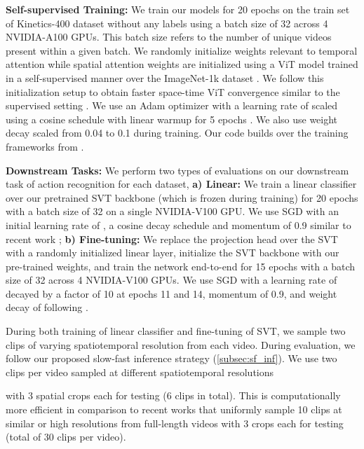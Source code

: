 \documentclass[10pt,twocolumn,letterpaper]{article}
\begin{document}
\vspace{0.1em}
\noindent\textbf{Self-supervised Training:} We train our models for 20 epochs on the train set of Kinetics-400 dataset \cite{kinetics400} without any labels using a batch size of 32 across 4 NVIDIA-A100 GPUs. This batch size refers to the number of unique videos present within a given batch. We randomly initialize weights relevant to temporal attention while spatial attention weights are initialized using a ViT model trained in a self-supervised manner over the ImageNet-1k dataset \cite{imagenet}. We follow this initialization setup to obtain faster space-time ViT convergence similar to the supervised setting \cite{gberta_2021_ICML}. We use an Adam optimizer \cite{kingma15adam} with a learning rate of  scaled using a cosine schedule with linear warmup for 5 epochs \cite{Steiner2021HowTT, chen2021mocov3}. We also use weight decay scaled from 0.04 to 0.1 during training. Our code builds over the training frameworks from \cite{gberta_2021_ICML, fan2020pyslowfast, rw2019timm, caron2021emerging}. 

\vspace{0.1em}
\noindent\textbf{Downstream Tasks:} We perform two types of evaluations on our downstream task of action recognition for each dataset, \textbf{a) Linear:} We train a linear classifier over our pretrained SVT backbone (which is frozen during training) for 20 epochs with a batch size of 32 on a single NVIDIA-V100 GPU. We use SGD with an initial learning rate of , a cosine decay schedule and momentum of 0.9 similar to recent work \cite{caron2021emerging, qian2020spatiotemporal}; \textbf{b) Fine-tuning:} We replace the projection head over the SVT with a randomly initialized linear layer, initialize the SVT backbone with our pre-trained weights, and train the network end-to-end for 15 epochs with a batch size of 32 across 4 NVIDIA-V100 GPUs.  We use SGD with a learning rate of  decayed by a factor of 10 at epochs 11 and 14, momentum of 0.9, and weight decay of  following \cite{gberta_2021_ICML}.

During both training of linear classifier and fine-tuning of SVT, we sample two clips of varying spatiotemporal resolution from each video. During evaluation, we follow our proposed slow-fast inference strategy (\cref{subsec:sf_inf}). We use two clips per video sampled at different spatiotemporal resolutions
 
with 3 spatial crops each for testing (6 clips in total). This is computationally more efficient in comparison to recent works \cite{qian2020spatiotemporal, recasens2021broaden} that uniformly sample 10 clips at similar or high resolutions from full-length videos with 3 crops each for testing (total of 30 clips per video).
\end{document}
